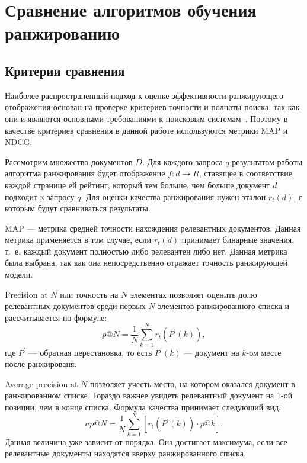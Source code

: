 \chapter[Сравнение алгоритмов обучения ранжированию]{Сравнение алгоритмов обучения\\ранжированию}

\section{Критерии сравнения}

Наиболее распространенный подход к оценке эффективности ранжирующего отображения основан на проверке критериев точности и полноты поиска, так как они и являются основными требованиями к поисковым системам~\cite{metrics}. Поэтому в качестве критериев сравнения в данной работе используются метрики MAP и NDCG.

Рассмотрим множество документов $D$. Для каждого запроса $q$ результатом работы алгоритма ранжирования будет отображение $f: d \to R$, ставящее в соответствие каждой странице ей рейтинг, который тем больше, чем больше документ $d$ подходит к запросу $q$. Для оценки качества ранжирования нужен эталон $r_t(d)$, с которым будут сравниваться результаты.
 
MAP --- метрика средней точности нахождения релевантных документов. Данная метрика применяется в том случае, если $r_t(d)$ принимает бинарные значения, т.~е. каждый документ полностью либо релевантен либо нет. Данная метрика была выбрана, так как она непосредственно отражает точность ранжирующей модели.

Precision at $N$ или точность на $N$ элементах позволяет оценить долю релевантных документов среди первых $N$ элементов ранжированного списка и рассчитывается по формуле:
\begin{equation}
	\label{eq:map1}
	p @ N=\frac{1}{N} \sum_{k=1}^N r_t(P^{\prime}(k)),
\end{equation}
где $P^{\prime}$ --- обратная перестановка, то есть $P^{\prime}(k)$ --- документ на $k$-ом месте после ранжированя.

Average precision at $N$ позволяет учесть место, на котором оказался документ в ранжированном списке. Гораздо важнее увидеть релевантный документ на 1-ой позиции, чем в конце списка. Формула качества принимает
следующий вид: 
\begin{equation}
	\label{eq:map2}
	ap @ N=\frac{1}{N} \sum_{k=1}^N [r_t(P^{\prime}(k)) \cdot p@k].
\end{equation}
Данная величина уже зависит от порядка. Она достигает максимума, если все релевантные документы находятся вверху ранжированного списка.

